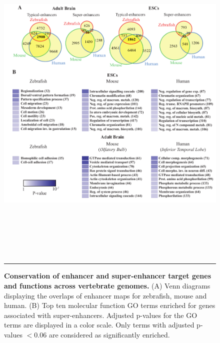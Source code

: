 		\begin{figure}[!h]
			\centering
			\includegraphics[width=16cm,height=16cm]{./figures/Figure_5.pdf}
  			\caption[Conservation]{\textbf{Conservation of enhancer and super-enhancer target genes and functions across vertebrate genomes.} (A) Venn diagrams displaying the overlaps of enhancer maps for zebrafish, mouse and human. (B) Top ten molecular function GO terms enriched for genes associated with super-enhancers. Adjusted p-values for the GO terms are displayed in a color scale. Only terms with adjusted p-values $<0.06$ are considered as significantly enriched.}
			\label{Conservation}
			\rule{\textwidth}{0.25mm}
		\end{figure}

